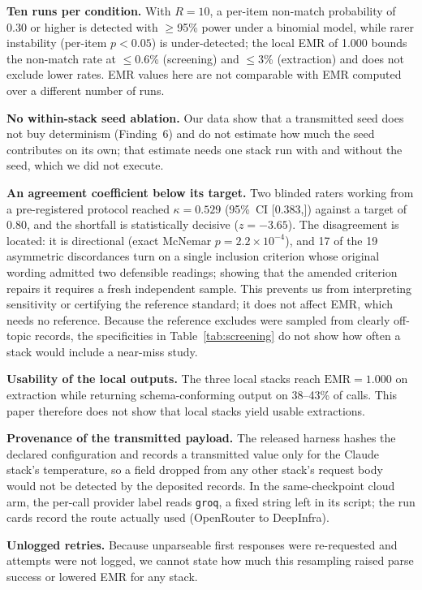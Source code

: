 \documentclass[preprint,review,12pt,authoryear]{elsarticle}
\newcommand{\emr}{\textrm{EMR}}
\newcommand{\ci}[2]{[#1,\;#2]}
\begin{document}
\textbf{Ten runs per condition.}
With $R{=}10$, a per-item non-match probability of 0.30 or higher is detected with $\geq$95\% power under a binomial model, while rarer instability (per-item $p{<}0.05$) is under-detected; the local EMR of 1.000 bounds the non-match rate at $\leq$0.6\% (screening) and $\leq$3\% (extraction) and does not exclude lower rates. EMR values here are not comparable with EMR computed over a different number of runs.

\textbf{No within-stack seed ablation.}
Our data show that a transmitted seed does not buy determinism (Finding~6) and do not estimate how much the seed contributes on its own; that estimate needs one stack run with and without the seed, which we did not execute.

\textbf{An agreement coefficient below its target.}
Two blinded raters working from a pre-registered protocol reached $\kappa{=}0.529$ (95\%~CI \ci{0.383}{0.674}) against a target of 0.80, and the shortfall is statistically decisive ($z{=}-3.65$).
The disagreement is located: it is directional (exact McNemar $p{=}2.2{\times}10^{-4}$), and 17 of the 19 asymmetric discordances turn on a single inclusion criterion whose original wording admitted two defensible readings; showing that the amended criterion repairs it requires a fresh independent sample.
This prevents us from interpreting sensitivity or certifying the reference standard; it does not affect EMR, which needs no reference. Because the reference excludes were sampled from clearly off-topic records, the specificities in Table~\ref{tab:screening} do not show how often a stack would include a near-miss study.

\textbf{Usability of the local outputs.}
The three local stacks reach $\emr{=}1.000$ on extraction while returning schema-conforming output on 38--43\% of calls. This paper therefore does not show that local stacks yield usable extractions.

\textbf{Provenance of the transmitted payload.}
The released harness hashes the declared configuration and records a transmitted value only for the Claude stack's temperature, so a field dropped from any other stack's request body would not be detected by the deposited records. In the same-checkpoint cloud arm, the per-call provider label reads \texttt{groq}, a fixed string left in its script; the run cards record the route actually used (OpenRouter to DeepInfra).

\textbf{Unlogged retries.}
Because unparseable first responses were re-requested and attempts were not logged, we cannot state how much this resampling raised parse success or lowered EMR for any stack.
\end{document}
